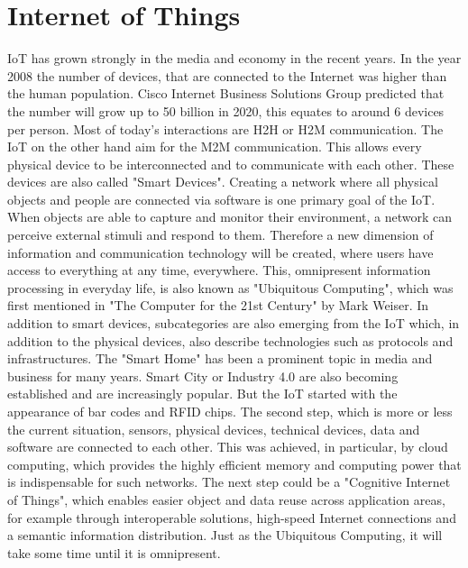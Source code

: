 \section{Internet of Things}
\ac{IoT} has grown strongly in the media and economy in the recent years.
In the year 2008 the number of devices, that are connected to the Internet was higher than the human population.\autocite[cf.][p. 3]{Eva:2011}
Cisco Internet Business Solutions Group predicted that the number will grow up to 50 billion in 2020, this equates to around 6 devices per person.\autocite[cf.][p. 4]{Eva:2011}
Most of today's interactions are \ac{H2H} or \ac{H2M} communication.
The \ac{IoT} on the other hand aim for the \ac{M2M} communication.
This allows every physical device to be interconnected and to communicate with each other.
These devices are also called "Smart Devices".
Creating a network where all physical objects and people are connected via software is one primary goal of the \ac{IoT}.\autocite[cf.][p.206]{Rui:2015}\autocite[cf.][p.2]{Kra:2013}
When objects are able to capture and monitor their environment, a network can perceive external stimuli and respond to them.\autocite[cf.][p. 40]{Itu11}
Therefore a new dimension of information and communication technology will be created, where users have access to everything at any time, everywhere.
This, omnipresent information processing in everyday life, is also known as "Ubiquitous Computing", which was first mentioned in "The Computer for the 21st Century"\autocite{Wei:1991} by Mark Weiser.
In addition to smart devices, subcategories are also emerging from the \ac{IoT} which, in addition to the physical devices, also describe technologies such as protocols and infrastructures.
The "Smart Home" has been a prominent topic in media and business for many years.
Smart City or Industry 4.0 are also becoming established and are increasingly popular.
But the \ac{IoT} started with the appearance of bar codes and \ac{RFID} chips.\autocite[cf.][p. 13]{Kra:2013}
The second step, which is more or less the current situation, sensors, physical devices, technical devices, data and software are connected to each other.\autocite[cf.][p. 13]{Kra:2013}
This was achieved, in particular, by cloud computing, which provides the highly efficient memory and computing power that is indispensable for such networks.\autocite[cf.][p. 206]{Rui:2015}
The next step could be a "Cognitive Internet of Things", which enables easier object and data reuse across application areas, for example through interoperable solutions, high-speed Internet connections and a semantic information distribution.\autocite[cf.][p. V]{Kra:2013}
Just as the Ubiquitous Computing, it will take some time until it is omnipresent.


